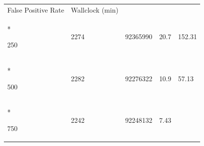 \documentclass[
  12pt,
  oneside,
  openany]{book}
\begin{document}
\begin{appendices}
\begin{singlespace}
\begin{longtable}[]{@{}lllll@{}}
\begin{minipage}[b]{0.24\columnwidth}
False Positive Rate\strut
\end{minipage} & \begin{minipage}[b]{0.18\columnwidth}\raggedright
Wallclock (min)\strut
\end{minipage}\tabularnewline*
\midrule
\endhead
\begin{minipage}[t]{0.16\columnwidth}\raggedright
250\strut
\end{minipage} & \begin{minipage}[t]{0.09\columnwidth}\raggedright
2274\strut
\end{minipage} & \begin{minipage}[t]{0.18\columnwidth}\raggedright
92365990\strut
\end{minipage} & \begin{minipage}[t]{0.24\columnwidth}\raggedright
20.7\strut
\end{minipage} & \begin{minipage}[t]{0.18\columnwidth}\raggedright
152.31\strut
\end{minipage}\tabularnewline*
\begin{minipage}[t]{0.16\columnwidth}\raggedright
500\strut
\end{minipage} & \begin{minipage}[t]{0.09\columnwidth}\raggedright
2282\strut
\end{minipage} & \begin{minipage}[t]{0.18\columnwidth}\raggedright
92276322\strut
\end{minipage} & \begin{minipage}[t]{0.24\columnwidth}\raggedright
10.9\strut
\end{minipage} & \begin{minipage}[t]{0.18\columnwidth}\raggedright
57.13\strut
\end{minipage}\tabularnewline*
\begin{minipage}[t]{0.16\columnwidth}\raggedright
750\strut
\end{minipage} & \begin{minipage}[t]{0.09\columnwidth}\raggedright
2242\strut
\end{minipage} & \begin{minipage}[t]{0.18\columnwidth}\raggedright
92248132\strut
\end{minipage} & \begin{minipage}[t]{0.24\columnwidth}\raggedright
7.43\strut
\end{minipage} & \begin{minipage}[t]{0.18\columnwidth}\raggedright

\end{minipage}
\end{longtable}
\end{singlespace}
\end{appendices}
\end{document}
